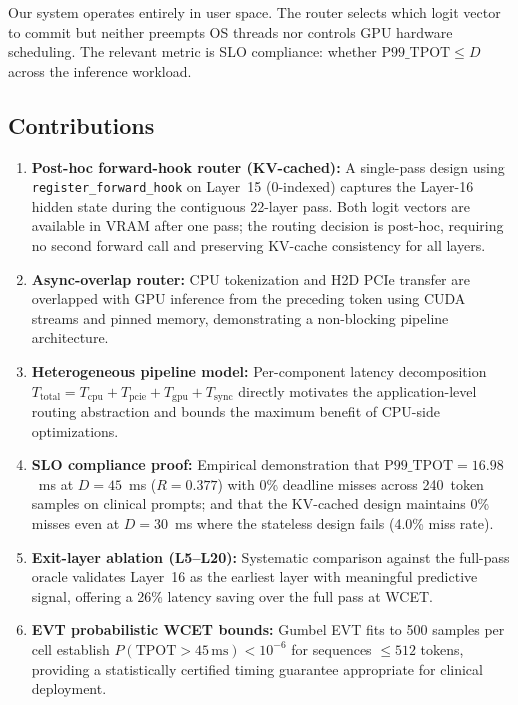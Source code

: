 \documentclass[conference]{IEEEtran}
\begin{document}
Our system operates entirely in user space.
The router selects which logit vector to commit but neither preempts OS
threads nor controls GPU hardware scheduling.
The relevant metric is SLO compliance: whether
$\text{P99\_TPOT} \leq D$ across the inference workload.

\subsection{Contributions}

\begin{enumerate}[leftmargin=*]
\item \textbf{Post-hoc forward-hook router (KV-cached):}
      A single-pass design using \texttt{register\_forward\_hook} on
      Layer~15 (0-indexed) captures the Layer-16 hidden state during the
      contiguous 22-layer pass. Both logit vectors are available in VRAM
      after one pass; the routing decision is post-hoc, requiring no
      second forward call and preserving KV-cache consistency for all layers.

\item \textbf{Async-overlap router:}
      CPU tokenization and H2D PCIe transfer are overlapped with GPU
      inference from the preceding token using CUDA streams and pinned
      memory, demonstrating a non-blocking pipeline architecture.

\item \textbf{Heterogeneous pipeline model:}
      Per-component latency decomposition $T_{\text{total}} =
      T_{\text{cpu}} + T_{\text{pcie}} + T_{\text{gpu}} + T_{\text{sync}}$
      directly motivates the application-level routing abstraction and
      bounds the maximum benefit of CPU-side optimizations.

\item \textbf{SLO compliance proof:}
      Empirical demonstration that $\text{P99\_TPOT} = 16.98$~ms
      at $D=45$~ms ($R=0.377$) with 0\% deadline misses across
      240~token samples on clinical prompts; and that the KV-cached
      design maintains 0\% misses even at $D=30$~ms where the
      stateless design fails (4.0\% miss rate).

\item \textbf{Exit-layer ablation (L5--L20):}
      Systematic comparison against the full-pass oracle validates
      Layer~16 as the earliest layer with meaningful predictive signal,
      offering a 26\% latency saving over the full pass at WCET.

\item \textbf{EVT probabilistic WCET bounds:}
      Gumbel EVT fits to 500 samples per cell establish
      $P(\text{TPOT}>45\,\text{ms})<10^{-6}$ for sequences $\leq 512$
      tokens, providing a statistically certified timing guarantee
      appropriate for clinical deployment.
\end{enumerate}
\end{document}
